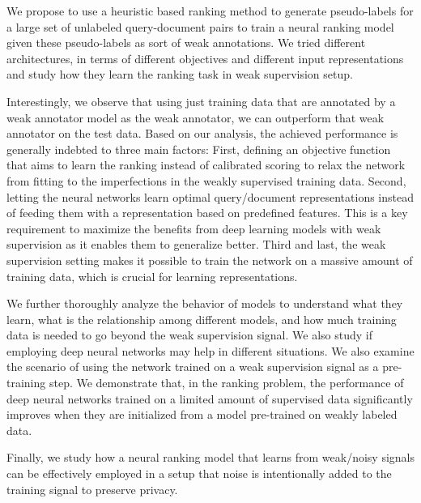 We propose to use a heuristic based ranking method to generate pseudo-labels for a large set of unlabeled query-document pairs to train a neural ranking model given these pseudo-labels as sort of weak annotations.  We tried different architectures, in terms of different objectives and different input representations and study how they learn the ranking task in weak supervision setup.

Interestingly, we observe that using just training data that are annotated by a weak annotator model as the weak annotator, we can outperform that weak annotator on the test data. Based on our analysis, the achieved performance is generally indebted to three main factors: 
%
First, defining an objective function that aims to learn the ranking instead of calibrated scoring to relax the network from fitting to the imperfections in the weakly supervised training data.
%
Second, letting the neural networks learn optimal query/document representations instead of feeding them with a representation based on predefined features. This is a key requirement to maximize the benefits from deep learning models with weak supervision as it enables them to generalize better.
%
Third and last, the weak supervision setting makes it possible to train the network on a massive amount of training data, which is crucial for learning representations.
%

We further thoroughly analyze the behavior of models to understand what they learn, what is the relationship among different models, and how much training data is needed to go beyond the weak supervision signal. We also study if employing deep neural networks may help in different situations.
%
We also examine the scenario of using the network trained on a weak supervision signal as a pre-training step. We demonstrate that, in the ranking problem, the performance of deep neural networks trained on a limited amount of supervised data significantly improves when they are initialized from a model pre-trained on weakly labeled data.

Finally, we study how a neural ranking model that learns from weak/noisy signals can be effectively employed in a setup that noise is intentionally added to the training signal to preserve privacy.


